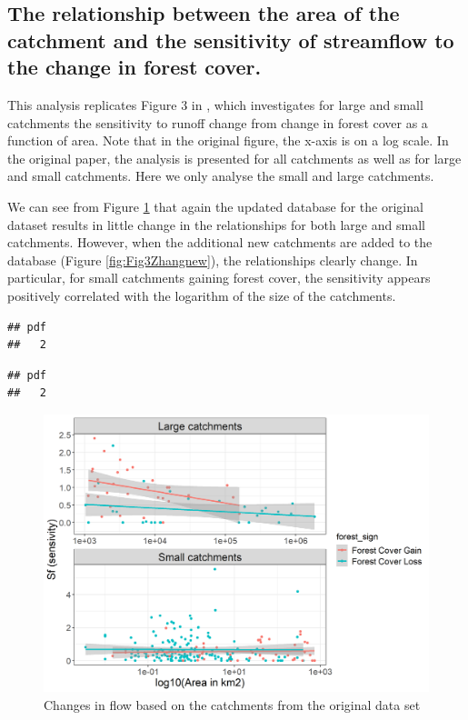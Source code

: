 \documentclass[]{elsarticle} %
\begin{document}
\hypertarget{the-relationship-between-the-area-of-the-catchment-and-the-sensitivity-of-streamflow-to-the-change-in-forest-cover.}{%
\subsection{The relationship between the area of the catchment and the sensitivity of streamflow to the change in forest cover.}\label{the-relationship-between-the-area-of-the-catchment-and-the-sensitivity-of-streamflow-to-the-change-in-forest-cover.}}

This analysis replicates Figure 3 in \citet{zhang2017}, which investigates for large and small catchments the sensitivity to runoff change from change in forest cover as a function of area. Note that in the original figure, the x-axis is on a log scale. In the original paper, the analysis is presented for all catchments as well as for large and small catchments. Here we only analyse the small and large catchments.

We can see from Figure \ref{fig:Fig3Zhang} that again the updated database for the original dataset results in little change in the relationships for both large and small catchments. However, when the additional new catchments are added to the database (Figure \ref{fig:Fig3Zhangnew}), the relationships clearly change. In particular, for small catchments gaining forest cover, the sensitivity appears positively correlated with the logarithm of the size of the catchments.

\begin{verbatim}
## pdf 
##   2
\end{verbatim}

\begin{verbatim}
## pdf 
##   2
\end{verbatim}

\begin{figure}
\includegraphics[width=0.9\linewidth]{Fig3Zhang} \caption{Changes in flow based on the catchments from the original data set}\label{fig:Fig3Zhang}
\end{figure}
\end{document}
